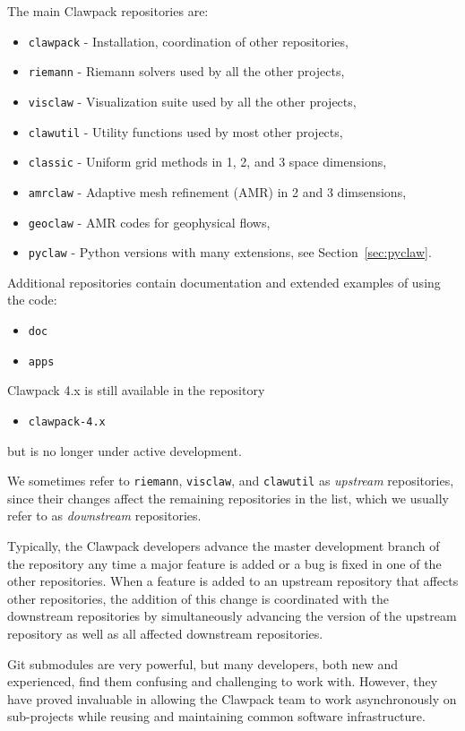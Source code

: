 The main Clawpack repositories are:
\begin{itemize}
    \item \texttt{clawpack} - Installation, coordination of other repositories,
    \item \texttt{riemann} - Riemann solvers used by all the other projects,
    \item \texttt{visclaw} - Visualization suite used by all the other projects,
    \item \texttt{clawutil} - Utility functions used by most other projects,
    \item \texttt{classic} - Uniform grid methods in 1, 2, and 3 space dimensions,
    \item \texttt{amrclaw} - Adaptive mesh refinement (AMR) in 2 and 3 dimsensions,
    \item \texttt{geoclaw} - AMR codes for geophysical flows,
    \item \texttt{pyclaw} - Python versions with many extensions, see
        Section~\ref{sec:pyclaw}.
\end{itemize}

Additional repositories contain documentation and extended examples of
using the code: 
\begin{itemize}
    \item \texttt{doc}
    \item \texttt{apps}
\end{itemize}
Clawpack 4.x is still available in the repository
\begin{itemize}
    \item \texttt{clawpack-4.x}
\end{itemize}
but is no longer under active development.

We sometimes refer to \texttt{riemann}, \texttt{visclaw}, and
\texttt{clawutil} as
\textit{upstream} repositories, since their changes affect the
remaining repositories in the list, which we usually refer to as
\textit{downstream} repositories.

Typically, the Clawpack developers advance the master development
branch of the repository any time a major feature is added or a bug is
fixed in one of the other repositories.  When a feature is added to an
upstream repository that affects other repositories, the addition of
this change is coordinated with the downstream repositories by
simultaneously advancing the version of the upstream repository as
well as all affected downstream repositories.  

Git submodules are very powerful, but many developers, both new and
experienced, find them confusing and challenging to work with.
However, they have proved invaluable in allowing the Clawpack team to
work asynchronously on sub-projects while reusing and maintaining
common software infrastructure.

